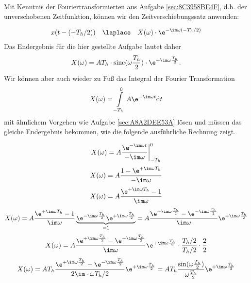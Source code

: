 \begin{Ansatz}
Mit Kenntnis der Fouriertransformierten aus Aufgabe \ref{sec:8C3958BE4F}, d.h. der
unverschobenen Zeitfunktion, können wir den Zeitverschiebungssatz anwenden:

\begin{equation}
x(t - (-T_h/2)) \quad \laplace \quad X(\omega) \cdot \e^{-\im\omega (-T_h/2)}
\end{equation}
Das Endergebnis für die hier gestellte Aufgabe lautet daher
\begin{equation}
X(\omega) = A T_h \cdot \mathrm{sinc}(\omega\frac{T_h}{2}) \cdot  \e^{+\im\omega\frac{T_h}{2}}.
\end{equation}
Wir können aber auch wieder zu Fuß das Integral der Fourier Transformation
\begin{equation}
X(\omega) = \int\limits_{-T_h}^{0} A \e^{-\im \omega t} \mathrm{d}t
\end{equation}
mit ähnlichem Vorgehen wie Aufgabe \ref{sec:A8A2DEE53A} lösen und müssen das
gleiche Endergebnis bekommen, wie die folgende ausführliche Rechnung zeigt.
\end{Ansatz}
\begin{ExCalc}
\begin{equation}
X(\omega) = A \frac{\e^{-\im \omega t}}{-\im \omega} \bigg|_{-T_h}^{0}
\end{equation}
\begin{equation}
X(\omega) = A \frac{1 - \e^{+\im \omega T_h}}{-\im \omega}
\end{equation}
\begin{equation}
X(\omega) = A \frac{\e^{+\im \omega T_h}-1}{\im \omega}
\end{equation}
\begin{equation}
X(\omega) = A \frac{\e^{+\im \omega T_h}-1}{\im \omega} \underbrace{\e^{-\im\omega\frac{T_h}{2}} \e^{+\im\omega\frac{T_h}{2}}}_{=1}=
A \frac{\e^{+\im\omega\frac{T_h}{2}} - \e^{-\im\omega\frac{T_h}{2}}}{\im\omega} \e^{+\im\omega\frac{T_h}{2}}
\end{equation}
\begin{equation}
X(\omega) = A \frac{\e^{+\im\omega\frac{T_h}{2}} - \e^{-\im\omega\frac{T_h}{2}}}{\im\omega} \e^{+\im\omega\frac{T_h}{2}}
\cdot \frac{T_h/2}{T_h/2} \cdot \frac{2}{2}
\end{equation}
\begin{equation}
X(\omega) = A T_h \frac{\e^{+\im\omega\frac{T_h}{2}} - \e^{-\im\omega\frac{T_h}{2}}}{2 \im \cdot \omega T_h/2} \e^{+\im\omega\frac{T_h}{2}} =
A T_h \frac{\sin(\omega\frac{T_h}{2})}{\omega\frac{T_h}{2}} \e^{+\im\omega\frac{T_h}{2}}
\end{equation}
\end{ExCalc}
